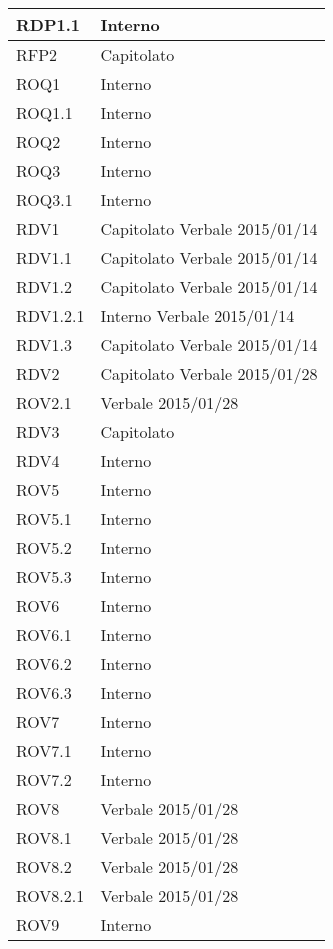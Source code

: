 \begin{center}
\begin{longtable}{| p{4cm} | p{4cm} |}
\hline
RDP1.1   &  Interno \\
\hline
RFP2   &  Capitolato \\
\hline
ROQ1   &  Interno \\
\hline
ROQ1.1   &  Interno \\
\hline
ROQ2   &  Interno \\
\hline
ROQ3   &  Interno \\
\hline
ROQ3.1   &  Interno \\
\hline
RDV1   &  Capitolato \newline Verbale 2015/01/14 \\
\hline
RDV1.1   &  Capitolato \newline Verbale 2015/01/14 \\
\hline
RDV1.2   &  Capitolato \newline Verbale 2015/01/14 \\
\hline
RDV1.2.1   &  Interno \newline Verbale 2015/01/14 \\
\hline
RDV1.3   &  Capitolato \newline Verbale 2015/01/14 \\
\hline
RDV2   &  Capitolato \newline Verbale 2015/01/28 \\
\hline
ROV2.1   &  Verbale 2015/01/28 \\
\hline
RDV3   &  Capitolato \\
\hline
RDV4   &  Interno \\
\hline
ROV5   &  Interno \\
\hline
ROV5.1   &  Interno \\
\hline
ROV5.2   &  Interno \\
\hline
ROV5.3   &  Interno \\
\hline
ROV6   &  Interno \\
\hline
ROV6.1   &  Interno \\
\hline
ROV6.2   &  Interno \\
\hline
ROV6.3   &  Interno \\
\hline
ROV7   &  Interno \\
\hline
ROV7.1   &  Interno \\
\hline
ROV7.2   &  Interno \\
\hline
ROV8   &  Verbale 2015/01/28 \\
\hline
ROV8.1   &  Verbale 2015/01/28 \\
\hline
ROV8.2   &  Verbale 2015/01/28 \\
\hline
ROV8.2.1   &  Verbale 2015/01/28 \\
\hline
ROV9   &  Interno \\
\hline
\end{longtable}
\egroup
\end{center}
